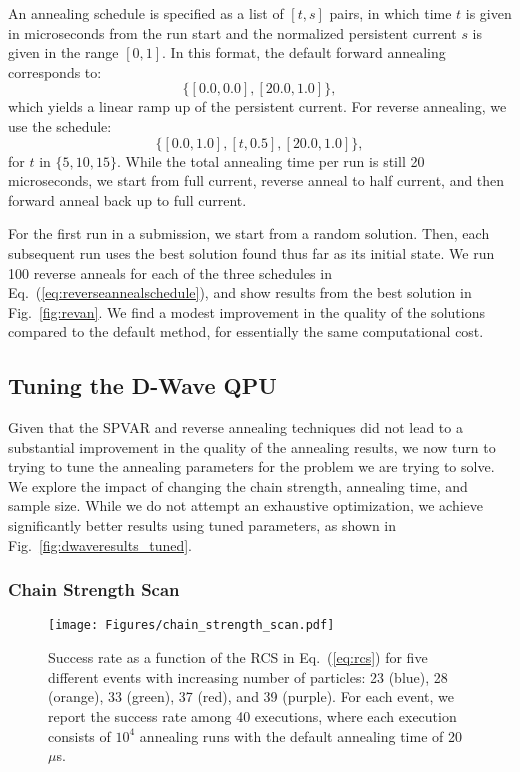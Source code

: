 \documentclass[aps,prd,twocolumn,superscriptaddress,preprintnumbers,nofootinbib,longbibliography,floatfix]{revtex4-1}
\DeclareRobustCommand{\Fig}[1]{Fig.~\ref{fig:#1}}
\DeclareRobustCommand{\Eq}[1]{Eq.~(\ref{eq:#1})}
\begin{document}
An annealing schedule is specified as a list of $[t,s]$ pairs, in which time $t$ is given in microseconds from the run start and the normalized persistent current $s$ is given in the range $[0,1]$.
%
In this format, the default forward annealing corresponds to: 
%
\begin{equation}
\{[0.0, 0.0], [20.0, 1.0]\},
\end{equation}
%
which yields a linear ramp up of the persistent current.
%
For reverse annealing, we use the schedule:
%
\begin{equation}
\label{eq:reverseannealschedule}
\{[0.0, 1.0], [t, 0.5], [20.0, 1.0]\},
\end{equation}
%
for $t$ in $\{ 5, 10,15 \}$.
%
While the total annealing time per run is still 20 microseconds, we start from full current, reverse anneal to half current, and then forward anneal back up to full current.



For the first run in a submission, we start from a random solution.
%
Then, each subsequent run uses the best solution found thus far as its initial state.
%
We run 100 reverse anneals for each of the three schedules in \Eq{reverseannealschedule},  and show results from the best solution in \Fig{revan}.
%
We find a modest improvement in the quality of the solutions  compared to the default method, for essentially the same computational cost.


\subsection{Tuning the D-Wave QPU}


Given that the SPVAR and reverse annealing techniques did not lead to a substantial improvement in the quality of the annealing results, we now turn to trying to tune the annealing parameters for the problem we are trying to solve.
%
We explore the impact of changing the chain strength, annealing time, and sample size.
%
While we do not attempt an exhaustive optimization, we achieve significantly better results using tuned parameters, as shown in \Fig{dwaveresults_tuned}.


\subsubsection{Chain Strength Scan}
\label{sec:chain_results}


\begin{figure}[t]
    \centering
    \texttt{[image: Figures/chain\_strength\_scan.pdf]}
    \caption{
    Success rate as a function of the RCS in \Eq{rcs} for five different events with increasing number of particles:
    23 (blue), 28 (orange), 33 (green),  37 (red), and 39 (purple).
    For each event, we report the success rate among 40 executions, where each execution consists of $10^{4}$ annealing runs with the default annealing time of 20 $\mu$s.
    }
    \label{fig:ch_str_Scan}
\end{figure}
\end{document}

